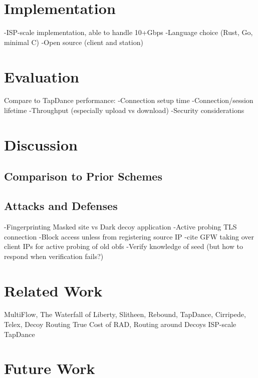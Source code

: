 \documentclass[letterpaper,twocolumn,10pt]{article}
\begin{document}
\section{Implementation}

-ISP-scale implementation, able to handle 10+Gbps
-Language choice (Rust, Go, minimal C)
-Open source (client and station)

\section{Evaluation}

Compare to TapDance performance:
-Connection setup time
-Connection/session lifetime
-Throughput (especially upload vs download)
-Security considerations


\section{Discussion}

\subsection{Comparison to Prior Schemes}

\TabCompare

\subsection{Attacks and Defenses}

-Fingerprinting Masked site vs Dark decoy application
-Active probing TLS connection
    -Block access unless from registering source IP
        -cite GFW taking over client IPs for active probing of old obfs
    -Verify knowledge of seed (but how to respond when verification fails?)




\section{Related Work}

MultiFlow, The Waterfall of Liberty, Slitheen, Rebound, TapDance, Cirripede, Telex, Decoy Routing
True Cost of RAD, Routing around Decoys
ISP-scale TapDance


\section{Future Work}
\end{document}
